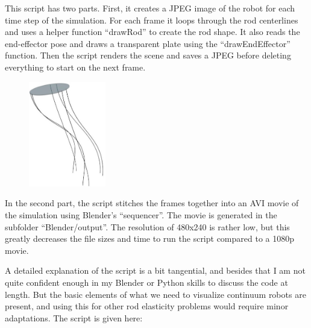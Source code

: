 \documentclass[12pt]{article}
\begin{document}
This script has two parts. First, it creates a JPEG image of the robot for each time step of the simulation. For each frame it loops through the rod centerlines and uses a helper function ``drawRod'' to create the rod shape. It also reads the end-effector pose and draws a transparent plate using the ``drawEndEffector'' function. Then the script renders the scene and saves a JPEG before deleting everything to start on the next frame.
\begin{figure}[h]
	\centering
		\includegraphics[width=0.3\textwidth]{fig/Render.jpg}
	\label{fig:Render}
\end{figure}

In the second part, the script stitches the frames together into an AVI movie of the simulation using Blender's ``sequencer''. The movie is generated in the subfolder ``Blender/output''. The resolution of 480x240 is rather low, but this greatly decreases the file sizes and time to run the script compared to a 1080p movie.

A detailed explanation of the script is a bit tangential, and besides that I am not quite confident enough in my Blender or Python skills to discuss the code at length. But the basic elements of what we need to visualize continuum robots are present, and using this for other rod elasticity problems would require minor adaptations. The script is given here:
\end{document}
